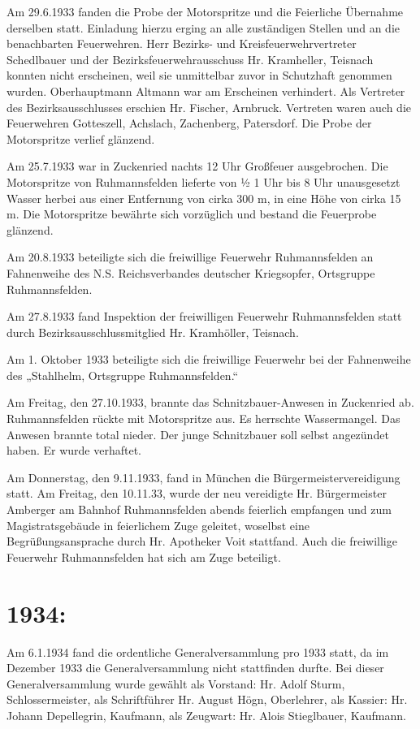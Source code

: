\documentclass[12pt,a4paper]{book}
\begin{document}
Am 29.6.1933 fanden die Probe der Motorspritze und die Feierliche Übernahme
derselben statt. Einladung hierzu erging an alle zuständigen Stellen und an die
benachbarten Feuerwehren. Herr Bezirks- und Kreisfeuerwehrvertreter Schedlbauer
und der Bezirksfeuerwehrausschuss Hr. Kramheller, Teisnach konnten nicht
erscheinen, weil sie unmittelbar zuvor in Schutzhaft genommen wurden.
Oberhauptmann Altmann war am Erscheinen verhindert. Als Vertreter des
Bezirksausschlusses erschien Hr. Fischer, Arnbruck. Vertreten waren auch die
Feuerwehren Gotteszell, Achslach, Zachenberg, Patersdorf. Die Probe der
Motorspritze verlief glänzend.

Am 25.7.1933 war in Zuckenried nachts 12 Uhr Großfeuer ausgebrochen. Die
Motorspritze von Ruhmannsfelden lieferte von ½ 1 Uhr bis 8 Uhr unausgesetzt
Wasser herbei aus einer Entfernung von cirka 300 m, in eine Höhe von cirka 15 m.
Die Motorspritze bewährte sich vorzüglich und bestand die Feuerprobe glänzend.

Am 20.8.1933 beteiligte sich die freiwillige Feuerwehr Ruhmannsfelden an
Fahnenweihe des N.S. Reichsverbandes deutscher Kriegsopfer, Ortsgruppe
Ruhmannsfelden.

Am 27.8.1933 fand Inspektion der freiwilligen Feuerwehr Ruhmannsfelden statt
durch Bezirksausschlussmitglied Hr. Kramhöller, Teisnach.

Am 1. Oktober 1933 beteiligte sich die freiwillige Feuerwehr bei der Fahnenweihe
des „Stahlhelm, Ortsgruppe Ruhmannsfelden.“

Am Freitag, den 27.10.1933, brannte das Schnitzbauer-Anwesen in Zuckenried ab.
Ruhmannsfelden rückte mit Motorspritze aus. Es herrschte Wassermangel. Das
Anwesen brannte total nieder. Der junge Schnitzbauer soll selbst angezündet
haben. Er wurde verhaftet.

Am Donnerstag, den 9.11.1933, fand in München die Bürgermeistervereidigung
statt. Am Freitag, den 10.11.33, wurde der neu vereidigte Hr. Bürgermeister
Amberger am Bahnhof Ruhmannsfelden abends feierlich empfangen und zum
Magistratsgebäude in feierlichem Zuge geleitet, woselbst eine
Begrüßungsansprache durch Hr. Apotheker Voit stattfand. Auch die freiwillige
Feuerwehr Ruhmannsfelden hat sich am Zuge beteiligt.

\section{1934:}

Am 6.1.1934 fand die ordentliche Generalversammlung pro 1933 statt, da im
Dezember 1933 die Generalversammlung nicht stattfinden durfte. Bei dieser
Generalversammlung wurde gewählt als Vorstand: Hr. Adolf Sturm,
Schlossermeister, als Schriftführer Hr. August Högn, Oberlehrer, als Kassier:
Hr. Johann Depellegrin, Kaufmann, als Zeugwart: Hr. Alois Stieglbauer, Kaufmann.
\end{document}
